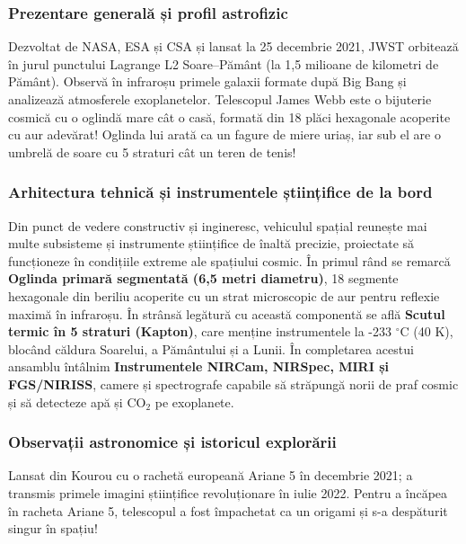 \subsubsection*{Prezentare generală și profil astrofizic}
Dezvoltat de NASA, ESA și CSA și lansat la 25 decembrie 2021, JWST orbitează în jurul punctului Lagrange L2 Soare--Pământ (la 1,5 milioane de kilometri de Pământ). Observă în infraroșu primele galaxii formate după Big Bang și analizează atmosferele exoplanetelor. Telescopul James Webb este o bijuterie cosmică cu o oglindă mare cât o casă, formată din 18 plăci hexagonale acoperite cu aur adevărat! Oglinda lui arată ca un fagure de miere uriaș, iar sub el are o umbrelă de soare cu 5 straturi cât un teren de tenis!

\subsubsection*{Arhitectura tehnică și instrumentele științifice de la bord}
Din punct de vedere constructiv și ingineresc, vehiculul spațial reunește mai multe subsisteme și instrumente științifice de înaltă precizie, proiectate să funcționeze în condițiile extreme ale spațiului cosmic. În primul rând se remarcă \textbf{Oglinda primară segmentată (6,5 metri diametru)}, 18 segmente hexagonale din beriliu acoperite cu un strat microscopic de aur pentru reflexie maximă în infraroșu. În strânsă legătură cu această componentă se află \textbf{Scutul termic în 5 straturi (Kapton)}, care menține instrumentele la -233 $^\circ$C (40 K), blocând căldura Soarelui, a Pământului și a Lunii. În completarea acestui ansamblu întâlnim \textbf{Instrumentele NIRCam, NIRSpec, MIRI și FGS/NIRISS}, camere și spectrografe capabile să străpungă norii de praf cosmic și să detecteze apă și CO$_2$ pe exoplanete.

\subsubsection*{Observații astronomice și istoricul explorării}
Lansat din Kourou cu o rachetă europeană Ariane 5 în decembrie 2021; a transmis primele imagini științifice revoluționare în iulie 2022. Pentru a încăpea în racheta Ariane 5, telescopul a fost împachetat ca un origami și s-a despăturit singur în spațiu!

